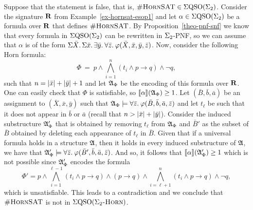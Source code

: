 Suppose that the statement is false, that is, $\textsc{\#HornSAT} \in \Sigma{\rm QSO}(\Sigma_{2})$. Consider the signature $\mathbf{R}$ from Example~\ref{ex-hornsat-esop1} and let $\alpha \in \Sigma{\rm QSO}(\Sigma_{2})$ be a formula over $\mathbf{R}$ that defines $\textsc{\#HornSAT}$. By Proposition~\ref{theo-pnf-snf} we know that every formula in $\Sigma{\rm QSO}(\Sigma_{2})$ can be rewritten in $\Sigma_{2}$-PNF, so we can assume that $\alpha$ is of the form $\Sigma{\bar{X}}.\,\Sigma{\bar{x}}.\, \exists{\bar{y}}.\: \forall{\bar{z}}.\:\varphi(\bar{X},\bar{x},\bar{y},\bar{z})$. Now, consider the following Horn formula:
$$
\Phi \ = \ p \wedge \bigwedge_{i = 1}^n (t_i \wedge p \to q) \wedge \neg q,
$$
such that $n = \vert \bar{x} \vert + \vert \bar{y} \vert + 1$ and let $\mathfrak{A}_{\Phi}$ be the encoding of this formula over $\mathbf{R}$. 
One can easily check that $\Phi$ is satisfiable, so ${\llbracket{}{\alpha}\rrbracket}(\mathfrak{A}_{\Phi}) \geq 1$. Let $(\bar{B},\bar{b},\bar{a})$ be an assignment to $(\bar{X},\bar{x},\bar{y})$ such that $\mathfrak{A}_{\Phi} \models \forall{\bar{z}}.\: \varphi(\bar{B},\bar{b},\bar{a},\bar{z})$ and let $t_{\ell}$ be such that it does not appear in $\bar{b}$ or $\bar{a}$ (recall that $n > \vert \bar{x} \vert + \vert \bar{y} \vert$). Consider the induced substructure $\mathfrak{A}_{\Phi}'$ that is obtained by removing $t_{\ell}$ from $\mathfrak{A}_{\Phi}$ and $\bar{B}'$ as the subset of $\bar{B}$ obtained by deleting each appearance of $t_{\ell}$ in $\bar{B}$. Given that if a universal formula holds in a structure $\mathfrak{A}$, then it holds in every induced substructure of $\mathfrak{A}$, we have that $\mathfrak{A}_{\Phi}'\models \forall{\bar{z}}.\:\varphi(\bar{B}',\bar{b},\bar{a},\bar{z})$. And so, it follows that ${\llbracket{}{\alpha}\rrbracket}(\mathfrak{A}_{\Phi}') \geq 1$ which is not possible since $\mathfrak{A}_{\Phi}'$ encodes the formula
$$
\Phi' = p \wedge \bigwedge_{i = 1}^{\ell-1} (t_i \wedge p \to q) \wedge (p\to q) \wedge \bigwedge_{i = \ell+1}^{n} (t_i \wedge p \to q) \wedge \neg q,
$$
which is unsatisfiable. This leads to a contradiction and we conclude that $\textsc{\#HornSAT}$ is not in $\Sigma{\rm QSO}(\Sigma_2\textsc{-Horn})$.
